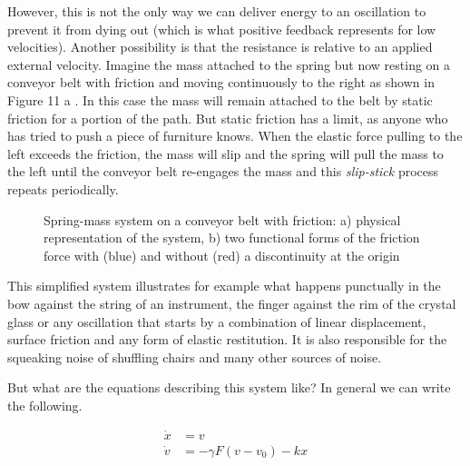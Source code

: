 \documentclass{article}
\begin{document}
However, this is not the only way we can deliver energy to an oscillation to prevent it from dying out (which is what positive feedback represents for low velocities). 
Another possibility is that the resistance is relative to an applied external velocity. 
Imagine the mass attached to the spring but now resting on a conveyor belt with friction and moving continuously to the right as shown in Figure 11 a . 
In this case the mass will remain attached to the belt by static friction for a portion of the path. 
But static friction has a limit, as anyone who has tried to push a piece of furniture knows. 
When the elastic force pulling to the left exceeds the friction, the mass will slip and the spring will pull the mass to the left until the conveyor belt re-engages the mass and this {\em slip-stick} process repeats periodically. 

\begin{figure}[h]
    \centering
    \caption{Spring-mass system on a conveyor belt with friction: a) physical representation of the system, b) two functional forms of the friction force with (blue) and without (red) a discontinuity at the origin} 
    \label{fig_belt}
\end{figure}

This simplified system illustrates for example what happens punctually in the bow against the string of an instrument, the finger against the rim of the crystal glass or any oscillation that starts by a combination of linear displacement, surface friction and any form of elastic restitution. 
It is also responsible for the squeaking noise of shuffling chairs and many other sources of noise. 

But what are the equations describing this system like? 
In general we can write the following. 


\begin{subequations} \label{eq_bow}
\begin{align}
    \dot{x} & = v \\
    \dot{v} & = - \gamma F(v-v_0) - kx
\end{align}
\end{subequations}
\end{document}
